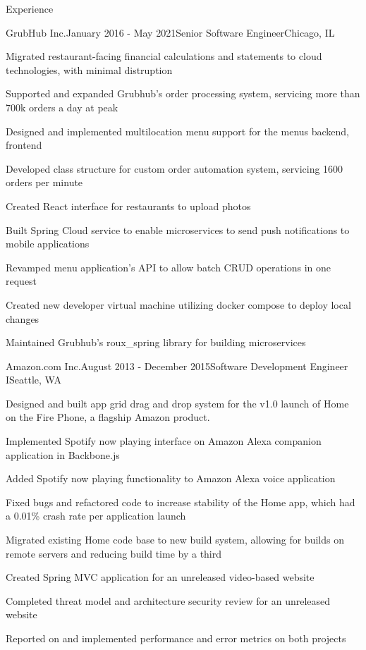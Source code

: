 \documentclass{resume} %
\begin{document}
\begin{rSection}{Experience}
\begin{rSubsection}{GrubHub Inc.}{January 2016 - May 2021}{Senior Software Engineer}{Chicago, IL}
\item Migrated restaurant-facing financial calculations and statements to cloud technologies, with minimal distruption
\item Supported and expanded Grubhub's order processing system, servicing more than 700k orders a day at peak
\item Designed and implemented multilocation menu support for the menus backend, frontend
\item Developed class structure for custom order automation system, servicing 1600 orders per minute
\item Created React interface for restaurants to upload photos
\item Built Spring Cloud service to enable microservices to send push notifications to mobile applications
\item Revamped menu application's API to allow batch CRUD operations in one request
\item Created new developer virtual machine utilizing docker compose to deploy local changes
\item Maintained Grubhub's roux\_spring library for building microservices
\end{rSubsection}


\begin{rSubsection}{Amazon.com Inc.}{August 2013 - December 2015}{Software Development Engineer I}{Seattle, WA}
\item Designed and built app grid drag and drop system for the v1.0 launch of Home on the Fire Phone, a flagship Amazon product.
\item Implemented Spotify now playing interface on Amazon Alexa companion application in Backbone.js
\item Added Spotify now playing functionality to Amazon Alexa voice application
\item Fixed bugs and refactored code to increase stability of the Home app, which had a 0.01\% crash rate per application launch
\item Migrated existing Home code base to new build system, allowing for builds on remote servers and reducing build time by a third
\item Created Spring MVC application for an unreleased video-based website
\item Completed threat model and architecture security review for an unreleased website
\item Reported on and implemented performance and error metrics on both projects
\end{rSubsection}


\end{rSection}
\end{document}
